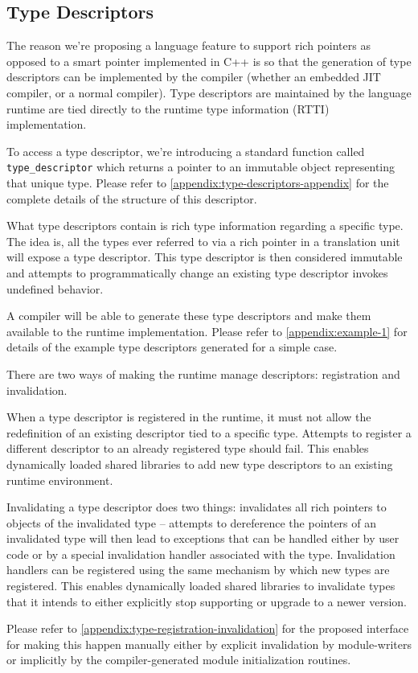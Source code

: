 \subsection{Type Descriptors}

The reason we’re proposing a language feature to support rich pointers as
opposed to a smart pointer implemented in C++ is so that the generation of type
descriptors can be implemented by the compiler (whether an embedded JIT
compiler, or a normal compiler). Type descriptors are maintained by the language
runtime are tied directly to the runtime type information (RTTI) implementation.

To access a type descriptor, we’re introducing a standard function called \\
\verb+type_descriptor+ which returns a pointer to an immutable object
representing that unique type. Please refer to
\autoref{appendix:type-descriptors-appendix} for the complete details of the
structure of this descriptor.

What type descriptors contain is rich type information regarding a specific
type. The idea is, all the types ever referred to via a rich pointer in a
translation unit will expose a type descriptor. This type descriptor is then
considered immutable and attempts to programmatically change an existing type
descriptor invokes undefined behavior.

A compiler will be able to generate these type descriptors and make them
available to the runtime implementation. Please refer to
\autoref{appendix:example-1} for details of the example type descriptors
generated for a simple case.

There are two ways of making the runtime manage descriptors: registration and
invalidation.

When a type descriptor is registered in the runtime, it must not allow the
redefinition of an existing descriptor tied to a specific type. Attempts to
register a different descriptor to an already registered type should fail. This
enables dynamically loaded shared libraries to add new type descriptors to an
existing runtime environment.

Invalidating a type descriptor does two things: invalidates all rich pointers to
objects of the invalidated type -- attempts to dereference the pointers of an
invalidated type will then lead to exceptions that can be handled either by user
code or by a special invalidation handler associated with the type. Invalidation
handlers can be registered using the same mechanism by which new types are
registered. This enables dynamically loaded shared libraries to invalidate types
that it intends to either explicitly stop supporting or upgrade to a newer
version. 

Please refer to \autoref{appendix:type-registration-invalidation} for the
proposed interface for making this happen manually either by explicit
invalidation by module-writers or implicitly by the compiler-generated module
initialization routines.

